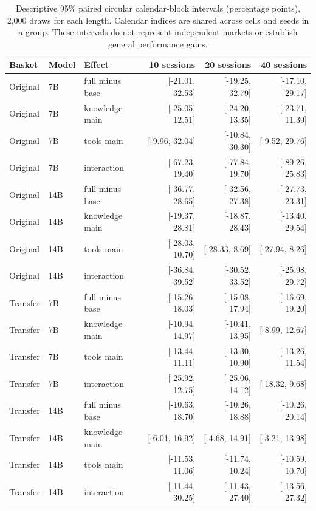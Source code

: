 \begin{table}[t]
\centering\small
\setlength{\tabcolsep}{4pt}
\begin{tabular}{lllrrr}
\toprule
Basket & Model & Effect & 10 sessions & 20 sessions & 40 sessions \\
\midrule
Original & 7B & full minus base & [-21.01, 32.53] & [-19.25, 32.79] & [-17.10, 29.17] \\
Original & 7B & knowledge main & [-25.05, 12.51] & [-24.20, 13.35] & [-23.71, 11.39] \\
Original & 7B & tools main & [-9.96, 32.04] & [-10.84, 30.30] & [-9.52, 29.76] \\
Original & 7B & interaction & [-67.23, 19.40] & [-77.84, 19.70] & [-89.26, 25.83] \\
Original & 14B & full minus base & [-36.77, 28.65] & [-32.56, 27.38] & [-27.73, 23.31] \\
Original & 14B & knowledge main & [-19.37, 28.81] & [-18.87, 28.43] & [-13.40, 29.54] \\
Original & 14B & tools main & [-28.03, 10.70] & [-28.33, 8.69] & [-27.94, 8.26] \\
Original & 14B & interaction & [-36.84, 39.52] & [-30.52, 33.52] & [-25.98, 29.72] \\
Transfer & 7B & full minus base & [-15.26, 18.03] & [-15.08, 17.94] & [-16.69, 19.20] \\
Transfer & 7B & knowledge main & [-10.94, 14.97] & [-10.41, 13.95] & [-8.99, 12.67] \\
Transfer & 7B & tools main & [-13.44, 11.11] & [-13.30, 10.90] & [-13.26, 11.54] \\
Transfer & 7B & interaction & [-25.92, 12.75] & [-25.06, 14.12] & [-18.32, 9.68] \\
Transfer & 14B & full minus base & [-10.63, 18.70] & [-10.26, 18.88] & [-10.26, 20.14] \\
Transfer & 14B & knowledge main & [-6.01, 16.92] & [-4.68, 14.91] & [-3.21, 13.98] \\
Transfer & 14B & tools main & [-11.53, 11.06] & [-11.74, 10.24] & [-10.59, 10.70] \\
Transfer & 14B & interaction & [-11.44, 30.25] & [-11.43, 27.40] & [-13.56, 27.32] \\
\bottomrule
\end{tabular}
\caption{Descriptive 95\% paired circular calendar-block intervals (percentage points), 2,000 draws for each length. Calendar indices are shared across cells and seeds in a group. These intervals do not represent independent markets or establish general performance gains.}
\label{tab:factorial-intervals}
\end{table}
